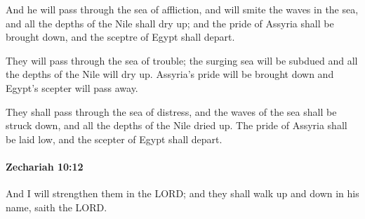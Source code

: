 			\begin{versebox}
					\item[BHS] 
					\item[LXX] 
					\item[ASV] And he will pass through the sea of affliction, and will smite the waves in the sea, and all the depths of the Nile shall dry up; and the pride of Assyria shall be brought down, and the sceptre of Egypt shall depart.
					\item[NIV] They will pass through the sea of trouble; the surging sea will be subdued and all the depths of the Nile will dry up. Assyria’s pride will be brought down and Egypt’s scepter will pass away.
					\item[NRSV] They shall pass through the sea of distress, and the waves of the sea shall be struck down, and all the depths of the Nile dried up. The pride of Assyria shall be laid low, and the scepter of Egypt shall depart.
			\end{versebox}

		\paragraph{Zechariah 10:12} %
			\label{ZECHARIAH-10-12}

			And I will strengthen them in the LORD; and they shall walk up and down in his name, saith the LORD.

